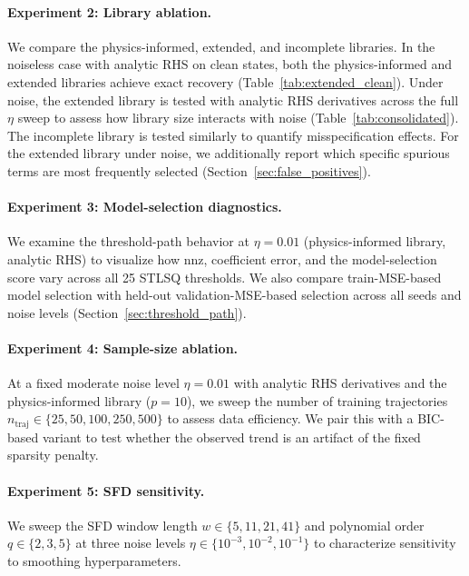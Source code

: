 \documentclass[12pt]{article}
\begin{document}
\paragraph{Experiment 2: Library ablation.}
We compare the physics-informed, extended, and incomplete libraries.
In the noiseless case with analytic RHS on clean states, both the physics-informed and extended libraries achieve exact recovery (Table~\ref{tab:extended_clean}).
Under noise, the extended library is tested with analytic RHS derivatives across the full $\eta$ sweep to assess how library size interacts with noise (Table~\ref{tab:consolidated}).
The incomplete library is tested similarly to quantify misspecification effects.
For the extended library under noise, we additionally report which specific spurious terms are most frequently selected (Section~\ref{sec:false_positives}).

\paragraph{Experiment 3: Model-selection diagnostics.}
\label{sec:exp_diagnostics}
We examine the threshold-path behavior at $\eta = 0.01$ (physics-informed library, analytic RHS) to visualize how nnz, coefficient error, and the model-selection score vary across all 25 STLSQ thresholds.
We also compare train-MSE-based model selection with held-out validation-MSE-based selection across all seeds and noise levels (Section~\ref{sec:threshold_path}).

\paragraph{Experiment 4: Sample-size ablation.}
At a fixed moderate noise level $\eta = 0.01$ with analytic RHS derivatives and the physics-informed library ($p=10$), we sweep the number of training trajectories $n_\text{traj} \in \{25, 50, 100, 250, 500\}$ to assess data efficiency.
We pair this with a BIC-based variant to test whether the observed trend is an artifact of the fixed sparsity penalty.

\paragraph{Experiment 5: SFD sensitivity.}
We sweep the SFD window length $w \in \{5, 11, 21, 41\}$ and polynomial order $q \in \{2, 3, 5\}$ at three noise levels $\eta \in \{10^{-3}, 10^{-2}, 10^{-1}\}$ to characterize sensitivity to smoothing hyperparameters.
\end{document}
